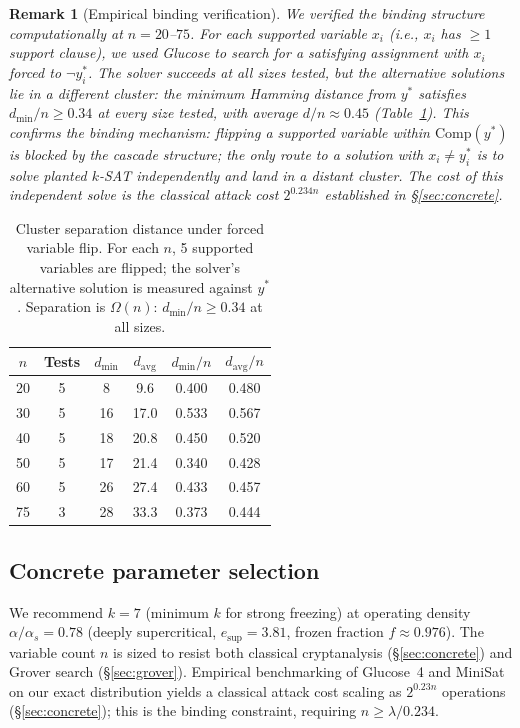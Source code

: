\documentclass[11pt]{article}
\newtheorem{remark}[theorem]{Remark}
\begin{document}
\begin{remark}[Empirical binding verification]\label{rem:binding-empirical}
We verified the binding structure computationally at $n = 20$--$75$.  For each supported variable $x_i$ (i.e., $x_i$ has $\geq 1$ support clause), we used Glucose to search for a satisfying assignment with $x_i$ forced to $\neg y^*_i$.  The solver succeeds at all sizes tested, but the alternative solutions lie in a \emph{different cluster}: the minimum Hamming distance from $y^*$ satisfies $d_{\min}/n \geq 0.34$ at every size tested, with average $d/n \approx 0.45$ (Table~\ref{tab:separation}).  This confirms the binding mechanism: flipping a supported variable within $\mathrm{Comp}(y^*)$ is blocked by the cascade structure; the only route to a solution with $x_i \neq y^*_i$ is to solve planted $k$-SAT independently and land in a distant cluster.  The cost of this independent solve is the classical attack cost $2^{0.234n}$ established in \S\ref{sec:concrete}.
\end{remark}

\begin{table}[ht]
\centering
\caption{Cluster separation distance under forced variable flip.  For each $n$, 5 supported variables are flipped; the solver's alternative solution is measured against $y^*$.  Separation is $\Omega(n)$: $d_{\min}/n \geq 0.34$ at all sizes.}\label{tab:separation}
\begin{tabular}{@{}cccccc@{}}
\toprule
$n$ & Tests & $d_{\min}$ & $d_{\mathrm{avg}}$ & $d_{\min}/n$ & $d_{\mathrm{avg}}/n$ \\
\midrule
20 & 5 & 8  & 9.6  & 0.400 & 0.480 \\
30 & 5 & 16 & 17.0 & 0.533 & 0.567 \\
40 & 5 & 18 & 20.8 & 0.450 & 0.520 \\
50 & 5 & 17 & 21.4 & 0.340 & 0.428 \\
60 & 5 & 26 & 27.4 & 0.433 & 0.457 \\
75 & 3 & 28 & 33.3 & 0.373 & 0.444 \\
\bottomrule
\end{tabular}
\end{table}


\subsection{Concrete parameter selection}\label{sec:params}

We recommend $k = 7$ (minimum $k$ for strong freezing) at operating density $\alpha/\alpha_s = 0.78$ (deeply supercritical, $e_{\mathrm{sup}} = 3.81$, frozen fraction $f \approx 0.976$).  The variable count $n$ is sized to resist both classical cryptanalysis (\S\ref{sec:concrete}) and Grover search (\S\ref{sec:grover}).  Empirical benchmarking of Glucose~4 and MiniSat on our exact distribution yields a classical attack cost scaling as $2^{0.23n}$ operations (\S\ref{sec:concrete}); this is the binding constraint, requiring $n \geq \lambda / 0.234$.
\end{document}
